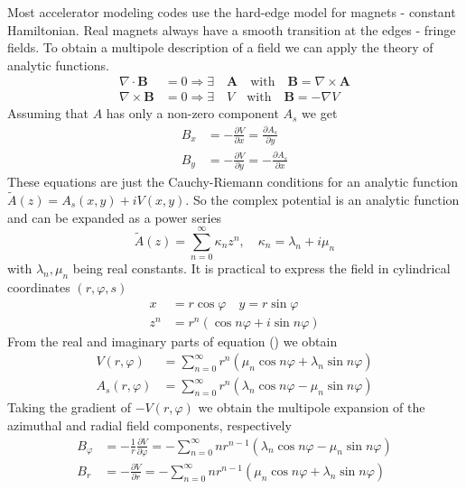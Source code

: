 Most accelerator modeling codes use the hard-edge model for magnets - constant Hamiltonian. Real magnets always have a smooth transition at the edges - fringe fields. To obtain a multipole description of a field we can apply the theory of analytic functions. 
	\begin{align}
		\nabla \cdot \mathbf{B} & = 0 \Rightarrow \exists \quad \mathbf{A} \quad \text{with} \quad \mathbf{B} = \nabla \times \mathbf{A} \\
		\nabla \times \mathbf{B} & = 0 \Rightarrow \exists \quad V \quad \text{with} \quad \mathbf{B} = - \nabla V
	\end{align}
Assuming that $A$ has only a non-zero component $A_s$ we get
	\begin{align}
		B_x & = - \frac{\partial V}{\partial x} = \frac{\partial A_s}{\partial y} \\
		B_y & = - \frac{\partial V}{\partial y} = - \frac{\partial A_s}{\partial x}	
	\end{align}
These equations are just the Cauchy-Riemann conditions for an analytic function $\tilde{A} (z) = A_s (x, y) + i V(x,y)$. So the complex potential is an analytic function and can be expanded as a power series
	\begin{equation}
		\tilde{A} (z) = \sum_{n=0}^{\infty} \kappa_n z^n, \quad \kappa_n = \lambda_n + i \mu_n
	\end{equation}
with $\lambda_n, \mu_n$ being real constants. It is practical to express the field in cylindrical coordinates $(r, \varphi, s)$ 
	\begin{align}
		x & = r \cos \varphi \quad y = r \sin \varphi	\\
		z^n & = r^n ( \cos n \varphi + i \sin n \varphi )
	\end{align}
From the real and imaginary parts of equation () we obtain 
	\begin{align}
		V(r, \varphi) & = \sum_{n=0}^{\infty} r^n ( \mu_n \cos n \varphi + \lambda_n \sin n \varphi ) \\
		A_s (r, \varphi) & = \sum_{n=0}^{\infty} r^n ( \lambda_n \cos n \varphi - \mu_n \sin n \varphi )
	\end{align}
Taking the gradient of $-V(r, \varphi)$ we obtain the multipole expansion of the azimuthal and radial field components, respectively
	\begin{align}
		B_{\varphi} & = - \frac{1}{r} \frac{\partial V}{\partial \varphi} = - \sum_{n=0}^{\infty} n r^{n-1} ( \lambda_n \cos n \varphi - \mu_n \sin n \varphi ) \\
		B_r & = - \frac{\partial V}{\partial r} = - \sum_{n=0}^{\infty} n r^{n-1} ( \mu_n \cos n \varphi + \lambda_n \sin n \varphi )
	\end{align}
